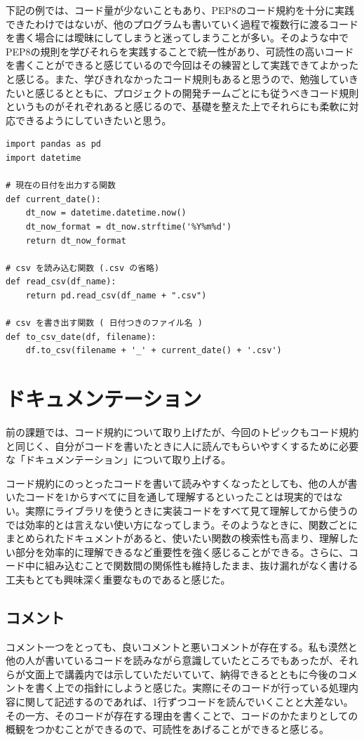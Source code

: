 \documentclass[12pt]{jsarticle}
\begin{document}
下記の例では、コード量が少ないこともあり、PEP8のコード規約を十分に実践できたわけではないが、他のプログラムも書いていく過程で複数行に渡るコードを書く場合には曖昧にしてしまうと迷ってしまうことが多い。そのような中でPEP8の規則を学びそれらを実践することで統一性があり、可読性の高いコードを書くことができると感じているので今回はその練習として実践できてよかったと感じる。また、学びきれなかったコード規則もあると思うので、勉強していきたいと感じるとともに、プロジェクトの開発チームごとにも従うべきコード規則というものがそれぞれあると感じるので、基礎を整えた上でそれらにも柔軟に対応できるようにしていきたいと思う。

\begin{lstlisting}[caption=tips.py]
import pandas as pd
import datetime

# 現在の日付を出力する関数
def current_date():
    dt_now = datetime.datetime.now()
    dt_now_format = dt_now.strftime('%Y%m%d')
    return dt_now_format

# csv を読み込む関数 (.csv の省略)
def read_csv(df_name):
    return pd.read_csv(df_name + ".csv")

# csv を書き出す関数 ( 日付つきのファイル名 )
def to_csv_date(df, filename):
    df.to_csv(filename + '_' + current_date() + '.csv')

\end{lstlisting}

\newpage
\section{ドキュメンテーション}
前の課題では、コード規約について取り上げたが、今回のトピックもコード規約と同じく、自分がコードを書いたときに人に読んでもらいやすくするために必要な「ドキュメンテーション」について取り上げる。

コード規約にのっとったコードを書いて読みやすくなったとしても、他の人が書いたコードを1からすべてに目を通して理解するといったことは現実的ではない。実際にライブラリを使うときに実装コードをすべて見て理解してから使うのでは効率的とは言えない使い方になってしまう。そのようなときに、関数ごとにまとめられたドキュメントがあると、使いたい関数の検索性も高まり、理解したい部分を効率的に理解できるなど重要性を強く感じることができる。さらに、コード中に組み込むことで関数間の関係性も維持したまま、抜け漏れがなく書ける工夫もとても興味深く重要なものであると感じた。

\subsection{コメント}
コメント一つをとっても、良いコメントと悪いコメントが存在する。私も漠然と他の人が書いているコードを読みながら意識していたところでもあったが、それらが文面上で講義内では示していただいていて、納得できるとともに今後のコメントを書く上での指針にしようと感じた。実際にそのコードが行っている処理内容に関して記述するのであれば、1行ずつコードを読んでいくことと大差ない。その一方、そのコードが存在する理由を書くことで、コードのかたまりとしての概観をつかむことができるので、可読性をあげることができると感じる。
\end{document}
